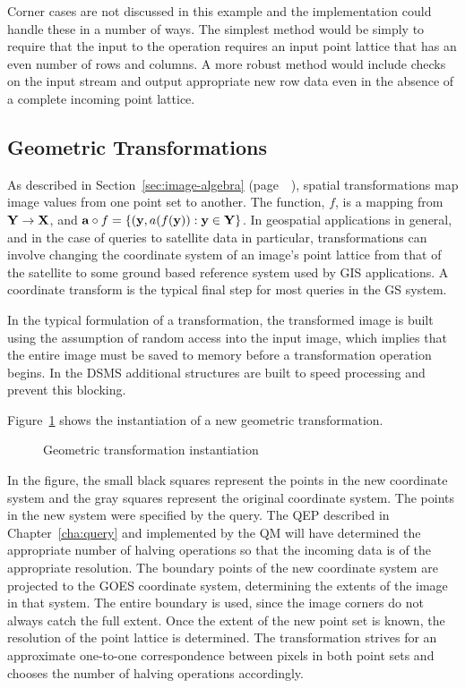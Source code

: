 \documentclass{ucdthesis}       %
\begin{document}
Corner cases are not discussed in this example and the implementation
could handle these in a number of ways.  The simplest method would be
simply to require that the input to the operation requires an input
point lattice that has an even number of rows and columns.  A more
robust method would include checks on the input stream and output
appropriate new row data even in the absence of a complete incoming
point lattice.

\subsection{Geometric Transformations}
\label{sec:geometric_transform_op}

As described in Section~\ref{sec:image-algebra}
(page~~\pageref{sec:image-algebra}), spatial transformations map image
values from one point set to another.  The function, $f$, is a mapping
from ${\bf{Y}} \rightarrow {\ensuremath{\bf{X}}}$, and ${\bf{a}} \circ f =
\{({\bf{y}},a(f({\bf{y}})): {\bf{y}} \in {\ensuremath{\bf{Y}}} \}$.  In geospatial applications
in general, and in the case of queries to satellite data in
particular, transformations can involve changing the coordinate system
of an image's point lattice from that of the satellite to some ground
based reference system used by \ac{GIS} applications.  A coordinate
transform is the typical final step for most queries in the \ac{GS}
system.

In the typical formulation of a transformation, the transformed image
is built using the assumption of random access into the input image,
which implies that the entire image must be saved to memory before a
transformation operation begins.  In the \ac{DSMS} additional
structures are built to speed processing and prevent this blocking.


Figure~\ref{fig:geometric-transform-new} shows the instantiation of a
new geometric transformation.
%
\begin{figure}[htb]
  \center
  
  \caption{Geometric transformation instantiation}
  \label{fig:geometric-transform-new}
\end{figure}
%
In the figure, the small black squares represent the points in the new
coordinate system and the gray squares represent the original
coordinate system.  The points in the new system were specified by the
query.  The \ac{QEP} described in Chapter~\ref{cha:query} and
implemented by the \ac{QM} will have determined the appropriate number
of halving operations so that the incoming data is of the appropriate
resolution.  The boundary points of the new coordinate system are
projected to the \ac{GOES} coordinate system, determining the extents
of the image in that system.  The entire boundary is used, since
the image corners do not always catch the full extent.  Once the
extent of the new point set is known, the resolution of the point
lattice is determined.  The transformation strives for an
approximate one-to-one correspondence between pixels in both point
sets and chooses the number of halving operations accordingly.
\end{document}
